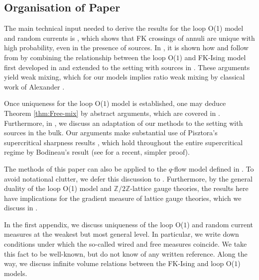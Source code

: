 \documentclass[article,11pt,reqno]{amsart}
\newcommand{\Z}{\mathbb{Z}}
\begin{document}
\subsection{Organisation of Paper %
}
The main technical input needed to derive the results for the loop O(1) model and random currents is , which shows that FK crossings of annuli are unique with high probability, even in the presence of sources. In , it is shown how 
and  follow from  by combining the relationship between the loop O($1$) and FK-Ising model first developed in \cite{evertz2002new, grimmett2007random} and extended to the setting with sources in \cite{aizenman2019emergent}.
These arguments yield weak mixing, which for our models implies ratio weak mixing by classical work of Alexander \cite[Theorem 3.3]{alexander1998weak}. 

Once uniqueness for the loop O($1$) model is established, one may deduce Theorem \ref{thm:Free-mix} by abstract arguments, which are covered in . Furthermore, in , we discuss an adaptation of our methods to the setting with sources in the bulk. Our arguments make substantial use of Pisztora's supercritical sharpness results \cite{Pis96}, which hold throughout the entire supercritical regime by Bodineau's result \cite{Bod05} (see \cite{SeverSlab} for a recent, simpler proof).

The methods of this paper can also be applied to the $q$-flow model defined in \cite{zhang2020loop}. To avoid notational clutter, we defer this discussion to . 
Furthermore, by the general duality of the loop O(1) model and  $\Z/2\Z$-lattice gauge theories, the results here have implications for the gradient measure of lattice gauge theories, which we discuss in .

In the first appendix, we discuss uniqueness of the loop O($1$) and random current measures at the weakest but most general level. In particular, we write down conditions under which the so-called wired and free measures coincide. We take this fact to be well-known, but do not know of any written reference. Along the way, we discuss infinite volume relations between the FK-Ising and loop O($1$) models.
\end{document}
